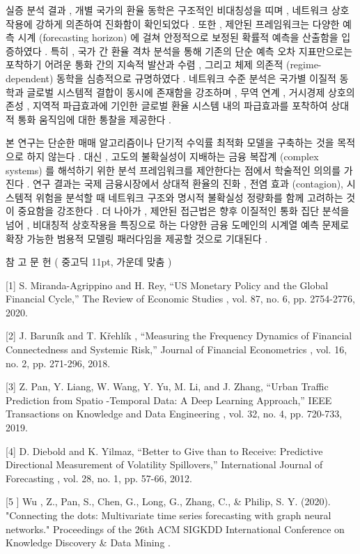 \documentclass[10pt,a4paper]{article}
\begin{document}
실증 분석 결과 , 개별 국가의 환율 동학은 구조적인 비대칭성을 띠며 , 네트워크 상호작용에 강하게 의존하여 진화함이 확인되었다 . 또한 , 제안된 프레임워크는 다양한 예측 시계 (forecasting horizon) 에 걸쳐 안정적으로 보정된 확률적 예측을 산출함을 입증하였다 . 특히 , 국가 간 환율 격차 분석을 통해 기존의 단순 예측 오차 지표만으로는 포착하기 어려운 통화 간의 지속적 발산과 수렴 , 그리고 체제 의존적 (regime-dependent) 동학을 심층적으로 규명하였다 . 네트워크 수준 분석은 국가별 이질적 동학과 글로벌 시스템적 결합이 동시에 존재함을 강조하며 , 무역 연계 , 거시경제 상호의존성 , 지역적 파급효과에 기인한 글로벌 환율 시스템 내의 파급효과를 포착하여 상대적 통화 움직임에 대한 통찰을 제공한다 .

본 연구는 단순한 매매 알고리즘이나 단기적 수익률 최적화 모델을 구축하는 것을 목적으로 하지 않는다 . 대신 , 고도의 불확실성이 지배하는 금융 복잡계 (complex systems) 를 해석하기 위한 분석 프레임워크를 제안한다는 점에서 학술적인 의의를 가진다 . 연구 결과는 국제 금융시장에서 상대적 환율의 진화 , 전염 효과 (contagion), 시스템적 위험을 분석할 때 네트워크 구조와 명시적 불확실성 정량화를 함께 고려하는 것이 중요함을 강조한다 . 더 나아가 , 제안된 접근법은 향후 이질적인 통화 집단 분석을 넘어 , 비대칭적 상호작용을 특징으로 하는 다양한 금융 도메인의 시계열 예측 문제로 확장 가능한 범용적 모델링 패러다임을 제공할 것으로 기대된다 .

참 고 문 헌 ( 중고딕 11pt, 가운데 맞춤 )

[1] S. Miranda-Agrippino and H. Rey, “US Monetary Policy and the Global Financial Cycle,” The Review of Economic Studies , vol. 87, no. 6, pp. 2754-2776, 2020.

[2] J. Baruník and T. Křehlík , “Measuring the Frequency Dynamics of Financial Connectedness and Systemic Risk,” Journal of Financial Econometrics , vol. 16, no. 2, pp. 271-296, 2018.

[3] Z. Pan, Y. Liang, W. Wang, Y. Yu, M. Li, and J. Zhang, “Urban Traffic Prediction from Spatio -Temporal Data: A Deep Learning Approach,” IEEE Transactions on Knowledge and Data Engineering , vol. 32, no. 4, pp. 720-733, 2019.

[4] D. Diebold and K. Yilmaz, “Better to Give than to Receive: Predictive Directional Measurement of Volatility Spillovers,” International Journal of Forecasting , vol. 28, no. 1, pp. 57-66, 2012.

[5 ] Wu , Z., Pan, S., Chen, G., Long, G., Zhang, C., \& Philip, S. Y. (2020). "Connecting the dots: Multivariate time series forecasting with graph neural networks." Proceedings of the 26th ACM SIGKDD International Conference on Knowledge Discovery \& Data Mining .
\end{document}

